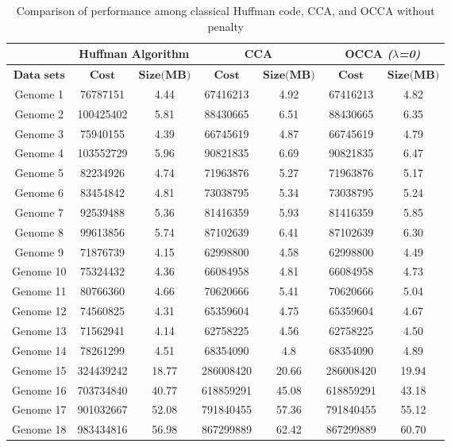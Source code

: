 \documentclass[preprint,12pt]{elsarticle}%
\begin{document}
\begin{table}[h]
\renewcommand{\arraystretch}{1.1}
\small
\label{table4}
\caption{Comparison of performance among classical Huffman code, CCA, and OCCA without penalty}

\begin{tabular}{c  c c  c c  c c}
\hline
 & \multicolumn{2}{c}{Huffman Algorithm} & \multicolumn{2}{c}{CCA }& \multicolumn{2}{c}{OCCA \textit{($\lambda$=0)}}\\\hline
$\textbf{Data sets}$ & $\textbf{Cost}$	& $\textbf{Size(MB)}$ &	$\textbf{Cost}$&	$\textbf{Size(MB)}$&$\textbf{Cost}$&	$\textbf{Size(MB)}$
\\\hline
Genome 1& 76787151  &	4.44	&67416213   & 4.92	& 67416213 & 4.82 \\\hline
Genome 2& 100425402 &  	5.81	& 88430665	& 6.51	& 88430665&  6.35 \\\hline
Genome 3& 75940155  &	4.39    &66745619	& 4.87&	66745619 & 4.79 \\\hline
Genome 4& 103552729 &	5.96    &90821835&	6.69 &	90821835  & 6.47\\\hline
Genome 5& 82234926  &	4.74	&71963876	& 5.27 &	71963876 &5.17 \\\hline
Genome 6& 83454842  &   4.81	&73038795	& 5.34	&73038795 & 5.24\\\hline
Genome 7& 92539488  &	5.36    &81416359   &5.93	&81416359 & 5.85\\\hline
Genome 8& 99613856  & 	5.74	&87102639   &6.41	&87102639&	6.30 \\\hline
Genome 9& 71876739  &	4.15    &62998800  &4.58 &	62998800 &	4.49 \\\hline
Genome 10& 75324432 & 	4.36	&66084958  &4.81	&66084958&	4.73 \\\hline
Genome 11& 80766360 &	4.66    &70620666  &5.41&	70620666&	5.04 \\\hline
Genome 12& 74560825 &	4.31    &65359604  &4.75	&65359604&	4.67\\\hline
Genome 13& 71562941 & 	4.14	&62758225  &4.56	&	62758225 &	4.50\\\hline
Genome 14& 78261299 & 	4.51    &68354090  &4.8&	68354090& 4.89  \\\hline
Genome 15& 324439242& 	18.77    &286008420 & 20.66	 &	286008420 &	19.94 \\\hline
Genome 16& 703734840&  40.77    &618859291 & 45.08  &	618859291 &	43.18 \\\hline
Genome 17& 901032667&  52.08    &791840455 &	57.36 &	791840455 &	55.12 \\\hline
Genome 18& 983434816&  56.98    &867299889 &	62.42 &	867299889 & 60.70 \\\hline

\end{tabular}
\end{table}
\end{document}
